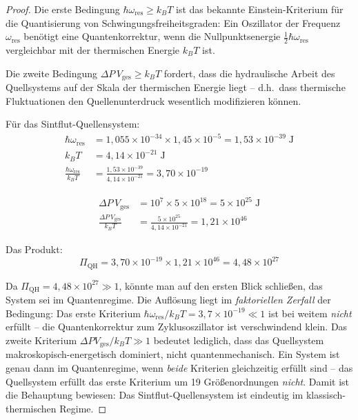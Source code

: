 ﻿\documentclass[12pt,a4paper]{report}
\begin{document}
\begin{proof}
	Die erste Bedingung $\hbar\omega_\mathrm{res} \geq k_BT$ ist das bekannte Einstein-Kriterium für die Quantisierung von Schwingungsfreiheitsgraden: Ein Oszillator der Frequenz $\omega_\mathrm{res}$ benötigt eine Quantenkorrektur, wenn die Nullpunktsenergie $\frac{1}{2}\hbar\omega_\mathrm{res}$ vergleichbar mit der thermischen Energie $k_BT$ ist.
	
	Die zweite Bedingung $\Delta P\,V_\mathrm{ges} \geq k_BT$ fordert, dass die hydraulische Arbeit des Quellsystems auf der Skala der thermischen Energie liegt -- d.h.\ dass thermische Fluktuationen den Quellenunterdruck wesentlich modifizieren können.
	
	Für das Sintflut-Quellensystem:
	\begin{align}
		\hbar\omega_\mathrm{res} &= 1{,}055\times10^{-34}\times1{,}45\times10^{-5} = 1{,}53\times10^{-39}\;\text{J} \\
		k_BT &= 4{,}14\times10^{-21}\;\text{J} \\
		\frac{\hbar\omega_\mathrm{res}}{k_BT} &= \frac{1{,}53\times10^{-39}}{4{,}14\times10^{-21}} = 3{,}70\times10^{-19} \label{eq:einstein_kriterium_sintflut}
	\end{align}
	
	\begin{align}
		\Delta P\,V_\mathrm{ges} &= 10^7\times5\times10^{18} = 5\times10^{25}\;\text{J} \\
		\frac{\Delta P\,V_\mathrm{ges}}{k_BT} &= \frac{5\times10^{25}}{4{,}14\times10^{-21}} = 1{,}21\times10^{46} \label{eq:hydraulik_kriterium_sintflut}
	\end{align}
	
	Das Produkt:
	\begin{equation}
		\Pi_\mathrm{QH} = 3{,}70\times10^{-19}\times1{,}21\times10^{46} = 4{,}48\times10^{27}
		\label{eq:pi_qh_numerisch}
	\end{equation}
	
	Da $\Pi_\mathrm{QH} = 4{,}48\times10^{27} \gg 1$, könnte man auf den ersten Blick schließen, das System sei im Quantenregime. Die Auflösung liegt im \textit{faktoriellen Zerfall} der Bedingung: Das erste Kriterium $\hbar\omega_\mathrm{res}/k_BT = 3{,}7\times10^{-19} \ll 1$ ist bei weitem \textit{nicht} erfüllt -- die Quantenkorrektur zum Zyklusoszillator ist verschwindend klein. Das zweite Kriterium $\Delta P V_\mathrm{ges}/k_BT \gg 1$ bedeutet lediglich, dass das Quellsystem makroskopisch-energetisch dominiert, nicht quantenmechanisch. Ein System ist genau dann im Quantenregime, wenn \textit{beide} Kriterien gleichzeitig erfüllt sind -- das Quellsystem erfüllt das erste Kriterium um 19 Größenordnungen \textit{nicht}. Damit ist die Behauptung bewiesen: Das Sintflut-Quellensystem ist eindeutig im klassisch-thermischen Regime.
\end{proof}
\end{document}
